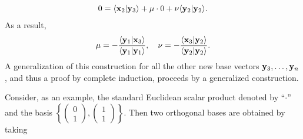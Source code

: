 {\begin{equation}
\begin{split}
\\
0 =\langle {\bf x}_2\vert {\bf y}_3 \rangle + \mu   \cdot 0  + \nu  \langle {\bf y}_2\vert {\bf y}_2 \rangle  .
\end{split}
\end{equation}
As a result,
\begin{equation}
\mu = -  \frac{\langle {\bf y}_1 \vert {\bf x}_3 \rangle}
{\langle {\bf y}_1\vert {\bf y}_1 \rangle},\quad
\nu =- \frac{\langle {\bf x}_3\vert {\bf y}_2  \rangle}
{\langle {\bf y}_2 \vert {\bf y}_2 \rangle}.
\end{equation}
A generalization of this construction
for all the other new base vectors
${\bf y}_3, \ldots ,  {\bf y}_n$, and thus a proof by complete induction,
proceeds by a generalized construction.
\eproof
}

{\color{blue}
\bexample
Consider, as an example, the standard Euclidean scalar product denoted by ``$\cdot$''
and the basis
$\left\{\begin{pmatrix}0\\1\end{pmatrix},\begin{pmatrix}1\\1\end{pmatrix}\right\}$.
Then two orthogonal bases are obtained by taking
}
